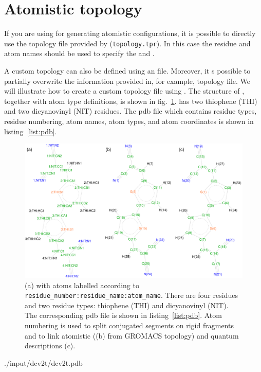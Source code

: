 \section{Atomistic topology}
\label{sec:atomistic}

If you are using \gromacs for generating atomistic configurations, it is possible to directly use the topology file provided by \gromacs (\texttt{topology.tpr}). In this case the \gromacs residue and atom names should be used to specify the  and . 

A custom topology can also be defined using an \xml file. Moreover, it s possible to partially overwrite the information provided in, for example, \gromacs topology file. We will illustrate how to create a custom topology file using \dcvt. The structure of \dcvt, together with atom type definitions, is shown in fig.~\ref{fig:dcv2t}. \dcvt has two thiophene (THI) and two dicyanovinyl (NIT) residues. The pdb file which contains residue types, residue numbering, atom names, atom types, and atom coordinates is shown in listing~\ref{list:pdb}.

\begin{figure}[ht]
\centering
\includegraphics[width=\textwidth]{./fig/dcv2t}
\caption{\small (a) \dcvt with atoms labelled according to \texttt{residue\_number:residue\_name:atom\_name}. 
There are four residues and two residue types: thiophene (THI) and dicyanovinyl (NIT). The corresponding pdb file is shown in listing~\ref{list:pdb}. 
Atom numbering is used to split conjugated segments on rigid fragments and to link atomistic ((b) from GROMACS topology) and quantum descriptions (c).}
\label{fig:dcv2t}
\end{figure}

%
{./input/dcv2t/dcv2t.pdb}
\vfill
